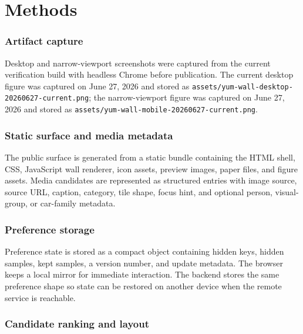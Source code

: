\documentclass[12pt,letterpaper]{article}
\newcommand{\backmattersection}[1]{\section*{#1}\markboth{#1}{}}
\begin{document}
\printbibliography

\backmattersection{Methods}

\subsubsection*{Artifact capture}

Desktop and narrow-viewport screenshots were captured from the current verification build with headless Chrome before publication. The current desktop figure was captured on June 27, 2026 and stored as \texttt{assets/yum-wall-desktop-20260627-current.png}; the narrow-viewport figure was captured on June 27, 2026 and stored as \texttt{assets/yum-wall-mobile-20260627-current.png}.

\subsubsection*{Static surface and media metadata}

The public surface is generated from a static bundle containing the HTML shell, CSS, JavaScript wall renderer, icon assets, preview images, paper files, and figure assets. Media candidates are represented as structured entries with image source, source URL, caption, category, tile shape, focus hint, and optional person, visual-group, or car-family metadata.

\subsubsection*{Preference storage}

Preference state is stored as a compact object containing hidden keys, hidden samples, kept samples, a version number, and update metadata. The browser keeps a local mirror for immediate interaction. The backend stores the same preference shape so state can be restored on another device when the remote service is reachable.

\subsubsection*{Candidate ranking and layout}
\end{document}
